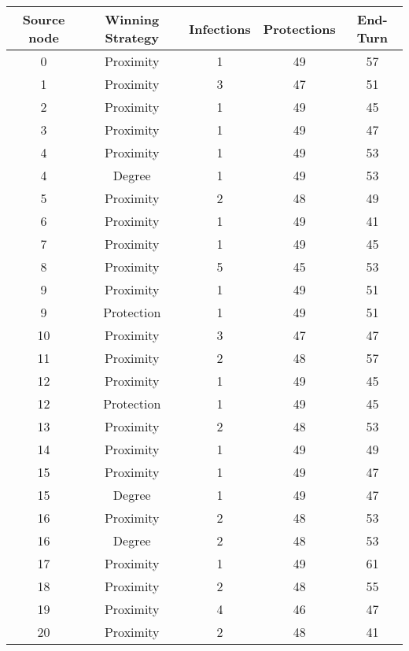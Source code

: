 \documentclass[results.tex]{subfiles}
\begin{document}
\begin{center}
  \begin{tabular}{| c || c | c | c | c |}
    \hline
    {\bfseries Source node} & {\bfseries Winning Strategy} & {\bfseries Infections} & {\bfseries Protections} & {\bfseries End-Turn} \\  %
    \hline\hline
    0 & Proximity & 1 & 49 & 57 \\ 
    \hline
    1 & Proximity & 3 & 47 & 51 \\ 
    \hline
    2 & Proximity & 1 & 49 & 45 \\ 
    \hline
    3 & Proximity & 1 & 49 & 47 \\ 
    \hline
    4 & Proximity & 1 & 49 & 53 \\ 
    \hline
    4 & Degree & 1 & 49 & 53 \\ 
    \hline
    5 & Proximity & 2 & 48 & 49 \\ 
    \hline
    6 & Proximity & 1 & 49 & 41 \\ 
    \hline
    7 & Proximity & 1 & 49 & 45 \\ 
    \hline
    8 & Proximity & 5 & 45 & 53 \\ 
    \hline
    9 & Proximity & 1 & 49 & 51 \\ 
    \hline
    9 & Protection & 1 & 49 & 51 \\ 
    \hline
    10 & Proximity & 3 & 47 & 47 \\ 
    \hline
    11 & Proximity & 2 & 48 & 57 \\ 
    \hline
    12 & Proximity & 1 & 49 & 45 \\ 
    \hline
    12 & Protection & 1 & 49 & 45 \\ 
    \hline
    13 & Proximity & 2 & 48 & 53 \\ 
    \hline
    14 & Proximity & 1 & 49 & 49 \\ 
    \hline
    15 & Proximity & 1 & 49 & 47 \\ 
    \hline
    15 & Degree & 1 & 49 & 47 \\ 
    \hline
    16 & Proximity & 2 & 48 & 53 \\ 
    \hline
    16 & Degree & 2 & 48 & 53 \\ 
    \hline
    17 & Proximity & 1 & 49 & 61 \\ 
    \hline
    18 & Proximity & 2 & 48 & 55 \\ 
    \hline
    19 & Proximity & 4 & 46 & 47 \\ 
    \hline
    20 & Proximity & 2 & 48 & 41 \\ 

\end{tabular}
\end{center}
\end{document}
